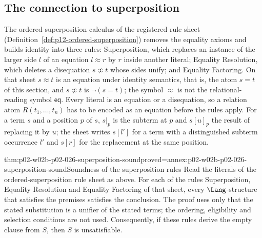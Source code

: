 \subsection{The connection to superposition}
\label{sec:p02-w02b-p02-026-superposition}

The ordered-superposition calculus of the registered rule sheet
(Definition~\ref{def:p12-ordered-superposition}) removes the equality axioms
and builds identity into three rules: Superposition, which replaces an
instance of the larger side \(l\) of an equation \(l\approx r\) by \(r\) inside
another literal; Equality Resolution, which deletes a disequation
\(s\not\approx t\) whose sides unify; and Equality Factoring.  On that sheet
\(s\approx t\) is an equation under identity semantics, that is, the atom
\(s=t\) of this section, and \(s\not\approx t\) is \(\neg(s=t)\); the symbol
\(\approx\) is not the relational-reading symbol \(\mathsf{eq}\).  Every
literal is an equation or a disequation, so a relation atom
\(R(t_1,\ldots,t_n)\) has to be encoded as an equation before the rules apply.
For a term \(s\) and a position \(p\) of \(s\), \(s|_p\) is the subterm at
\(p\) and \(s[u]_p\) the result of replacing it by \(u\); the sheet writes
\(s[l']\) for a term with a distinguished subterm occurrence \(l'\) and
\(s[r]\) for the replacement at the same position.

\begin{hblemma}{thm:p02-w02b-p02-026-superposition-sound}{proved=annex:p02-w02b-p02-026-superposition-sound}{Soundness of the superposition rules}
Read the literals of the ordered-superposition rule sheet as above.  For each of the rules Superposition, Equality Resolution and
Equality Factoring of that sheet, every \(\Lang\)-structure that satisfies the
premises satisfies the conclusion.  The proof uses only that the stated
substitution is a unifier of the stated terms; the ordering, eligibility and
selection conditions are not used.  Consequently, if these rules derive the
empty clause from \(S\), then \(S\) is unsatisfiable.
\end{hblemma}

